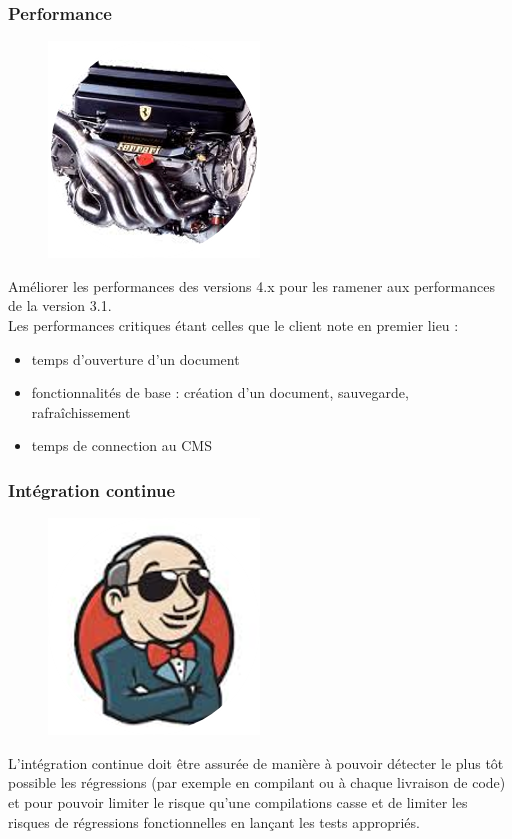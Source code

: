\subsubsection{Performance}
\begin{figure}[H]
  \centering
      \includegraphics{images/performance.png}
\end{figure}
Améliorer les performances des versions 4.x pour les ramener aux performances de la version 3.1.\\
Les performances critiques étant celles que le client note en premier lieu :
\begin{itemize}
	\item temps d'ouverture d'un document
	\item fonctionnalités de base : création d'un document, sauvegarde, rafra\^{i}chissement
	\item temps de connection au CMS
\end{itemize}


\subsubsection{Intégration continue}
\begin{figure}[H]
  \centering
      \includegraphics{images/ci.png}
\end{figure}
L'intégration continue doit être assurée de manière à pouvoir détecter le plus tôt possible les régressions (par exemple en compilant ou à chaque livraison de code) et pour pouvoir limiter le risque qu'une compilations casse et de limiter les risques de régressions fonctionnelles en lançant les tests appropriés.\\


